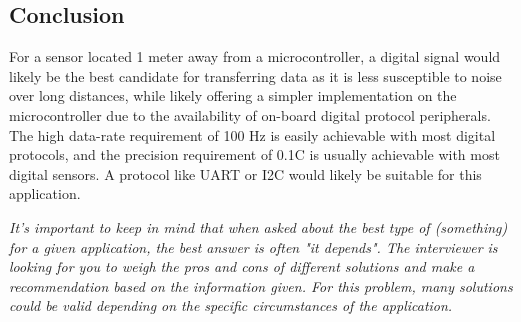 \documentclass[main.tex]{subfiles}
\begin{document}
\subsection{Conclusion}

\noindent For a sensor located 1 meter away from a microcontroller, a digital signal would likely be the best candidate for transferring data as it is less susceptible to noise over long distances, while likely offering a simpler implementation on the microcontroller due to the availability of on-board digital protocol peripherals. The high data-rate requirement of 100 Hz is easily achievable with most digital protocols, and the precision requirement of 0.1C is usually achievable with most digital sensors. A protocol like UART or I2C would likely be suitable for this application. \newline

\newnoindentpara \textit{It's important to keep in mind that when asked about the best type of (something) for a given application, the best answer is often "it depends". The interviewer is looking for you to weigh the pros and cons of different solutions and make a recommendation based on the information given. For this problem, many solutions could be valid depending on the specific circumstances of the application.}
\end{document}
